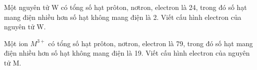 \begin{bt}%
	Một nguyên tử W có tổng số hạt prôton, nơtron, electron là 24, trong đó số hạt mang điện nhiều hơn số hạt không mang điện là 2. Viết cấu hình electron của nguyên tử W.
\end{bt}
\begin{bt}%
	Một ion $M^{3+}$ có tổng số hạt prôton, nơtron, electron là 79, trong đó số hạt mang điện nhiều hơn số hạt không mang điện là 19. Viết cấu hình electron của nguyên tử M.
\end{bt}
